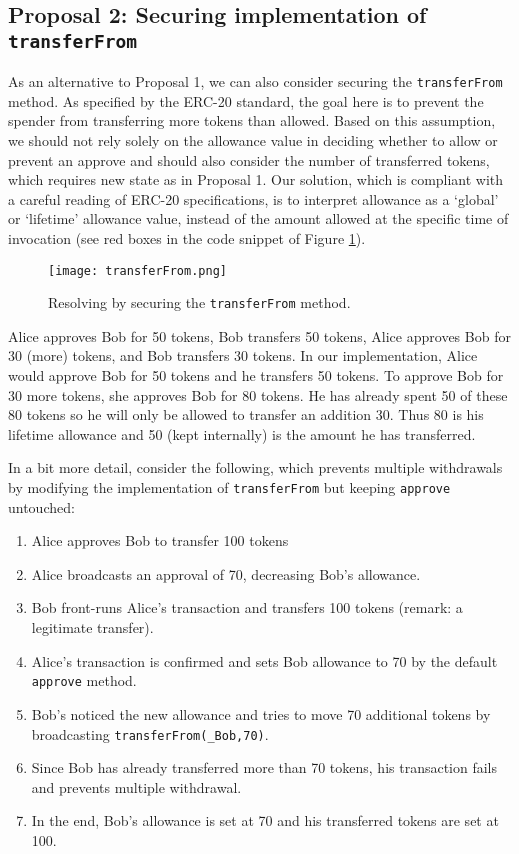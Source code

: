 \subsection{Proposal 2: Securing implementation of \texttt{transferFrom}}\label{subsec:prop2}
As an alternative to Proposal 1, we can also consider securing the \texttt{transferFrom} method. As specified by the ERC-20 standard, the goal here is to prevent the spender from transferring more tokens than allowed. Based on this assumption, we should not rely solely on the allowance value in deciding whether to allow or prevent an approve and should also consider the number of transferred tokens, which requires new state as in Proposal 1. Our solution, which is compliant with a careful reading of ERC-20 specifications, is to interpret allowance as a `global' or `lifetime' allowance value, instead of the amount allowed at the specific time of invocation (see red boxes in the code snippet of Figure \ref{fig:transfer}). 

\begin{figure}[t]
	\centering
	\texttt{[image: transferFrom.png]}
	\caption{Resolving \mwa by securing the \texttt{transferFrom} method.}
	\label{fig:transfer}
\end{figure}

\begin{example}
	Alice approves Bob for 50 tokens, Bob transfers 50 tokens, Alice approves Bob for 30 (more) tokens, and Bob transfers 30 tokens. In our implementation, Alice would approve Bob for 50 tokens and he transfers 50 tokens. To approve Bob for 30 more tokens, she approves Bob for 80 tokens. He has already spent 50 of these 80 tokens so he will only be allowed to transfer an addition 30. Thus 80 is his lifetime allowance and 50 (kept internally) is the amount he has transferred. 
\end{example}

In a bit more detail, consider the following, which prevents multiple withdrawals by modifying the implementation of \texttt{transferFrom} but keeping \texttt{approve} untouched:
\begin{enumerate}
	\item Alice approves Bob to transfer 100 tokens
	\item Alice broadcasts an approval of 70, decreasing Bob's allowance.
	\item Bob front-runs Alice’s transaction and transfers 100 tokens (remark: a legitimate transfer).
	\item Alice's transaction is confirmed and sets Bob allowance to 70 by the default \texttt{approve} method.
	\item Bob's noticed the new allowance and tries to move 70 additional tokens by broadcasting \texttt{transferFrom(\_Bob,70)}. 
	\item Since Bob has already transferred more than 70 tokens, his transaction fails and prevents multiple withdrawal. 
	\item In the end, Bob’s allowance is set at 70 and his transferred tokens are set at 100.
\end{enumerate}

